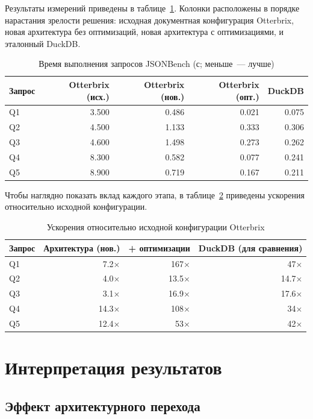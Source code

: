 Результаты измерений приведены в таблице~\ref{tab:times}. Колонки
расположены в порядке нарастания зрелости решения: исходная
документная конфигурация Otterbrix, новая архитектура без
оптимизаций, новая архитектура с оптимизациями, и эталонный
DuckDB.

\begin{table}[!h]
\caption{Время выполнения запросов JSONBench (с; меньше~--- лучше)}
\label{tab:times}
\centering
\begin{tabular}{|l|r|r|r|r|}\hline
Запрос & Otterbrix (исх.) & Otterbrix (нов.) & Otterbrix (опт.) & DuckDB \\\hline
Q1 & 3.500 & 0.486 & 0.021 & 0.075 \\\hline
Q2 & 4.500 & 1.133 & 0.333 & 0.306 \\\hline
Q3 & 4.600 & 1.498 & 0.273 & 0.262 \\\hline
Q4 & 8.300 & 0.582 & 0.077 & 0.241 \\\hline
Q5 & 8.900 & 0.719 & 0.167 & 0.211 \\\hline
\end{tabular}
\end{table}

Чтобы наглядно показать вклад каждого этапа, в таблице~\ref{tab:speedups}
приведены ускорения относительно исходной конфигурации.

\begin{table}[!h]
\caption{Ускорения относительно исходной конфигурации Otterbrix}
\label{tab:speedups}
\centering
\begin{tabular}{|l|r|r|r|}\hline
Запрос & Архитектура (нов.) & + оптимизации & DuckDB (для сравнения) \\\hline
Q1 & 7.2$\times$  & 167$\times$ & 47$\times$ \\\hline
Q2 & 4.0$\times$  & 13.5$\times$ & 14.7$\times$ \\\hline
Q3 & 3.1$\times$  & 16.9$\times$ & 17.6$\times$ \\\hline
Q4 & 14.3$\times$ & 108$\times$ & 34$\times$ \\\hline
Q5 & 12.4$\times$ & 53$\times$ & 42$\times$ \\\hline
\end{tabular}
\end{table}

\section{Интерпретация результатов}

\subsection{Эффект архитектурного перехода}

